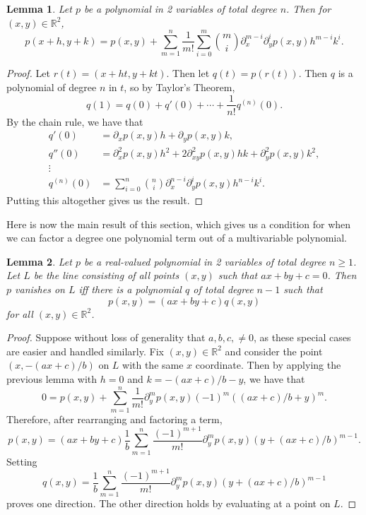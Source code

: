 \documentclass{article}
\theoremstyle{plain}
\newtheorem{lemma}{Lemma}
\theoremstyle{definition}
\theoremstyle{remark}
\begin{document}
\begin{lemma}
	Let $p$ be a polynomial in 2 variables of total degree $n$.
	Then for $(x,y) \in \mathbb R^2$,
	\[p(x+h,y+k) = p(x,y) + \sum_{m=1}^n\frac{1}{m!}\sum_{i=0}^m \binom{m}{i} \partial_x^{m-i}\partial_y^i p(x,y)h^{m-i}k^i.\]
\end{lemma}
\begin{proof}
	Let $r(t) = (x + ht, y + kt)$.
	Then let $q(t) = p(r(t))$.
	Then $q$ is a polynomial of degree $n$ in $t$, so by Taylor's Theorem,
	\[q(1) = q(0) + q'(0) + \cdots + \frac{1}{n!}q^{(n)}(0).\]
	By the chain rule, we have that
	\begin{align*}
		q'(0)      & = \partial_x p(x,y)h + \partial_y p(x,y)k,                                    \\
		q''(0)     & = \partial_x^2 p(x,y)h^2 + 2\partial_{xy}^2 p(x,y)hk + \partial_y^2p(x,y)k^2, \\
		\vdots                                                                                     \\
		q^{(n)}(0) & = \sum_{i=0}^n \binom{n}{i}\partial_x^{n-i}\partial_y^ip(x,y)h^{n-i}k^i.
	\end{align*}
	Putting this altogether gives us the result.
\end{proof}

Here is now the main result of this section, which gives us a condition for when we can factor a degree one polynomial term out of a multivariable polynomial.
\begin{lemma}\label{lem:factor}
	Let $p$ be a real-valued polynomial in 2 variables of total degree $n \geq 1$.
	Let $L$ be the line consisting of all points $(x,y)$ such that $ax + by + c = 0$.
	Then $p$ vanishes on $L$ iff there is a polynomial $q$ of total degree $n-1$ such that
	\[p(x,y) = (ax + by + c)q(x,y)\]
	for all $(x,y) \in \mathbb R^2$.
\end{lemma}
\begin{proof}
	Suppose without loss of generality that $a,b,c,\neq 0$, as these special cases are easier and handled similarly.
	Fix $(x,y) \in \mathbb R^2$ and consider the point $(x, -(ax + c)/b)$ on $L$ with the same $x$ coordinate.
	Then by applying the previous lemma with $h = 0$ and $k = -(ax + c)/b - y$, we have that
	\[0 = p(x,y) + \sum_{m=1}^n\frac{1}{m!}\partial_y^mp(x,y)(-1)^m((ax + c)/b + y)^m.\]
	Therefore, after rearranging and factoring a term,
	\[p(x,y) = (ax + by + c)\frac{1}{b}\sum_{m=1}^n\frac{(-1)^{m+1}}{m!}\partial_y^mp(x,y)(y + (ax + c)/b)^{m-1}.\]
	Setting
	\[q(x,y) = \frac{1}{b}\sum_{m=1}^n\frac{(-1)^{m+1}}{m!}\partial_y^mp(x,y)(y + (ax + c)/b)^{m-1}\]
	proves one direction.
	The other direction holds by evaluating at a point on $L$.
\end{proof}
\end{document}
